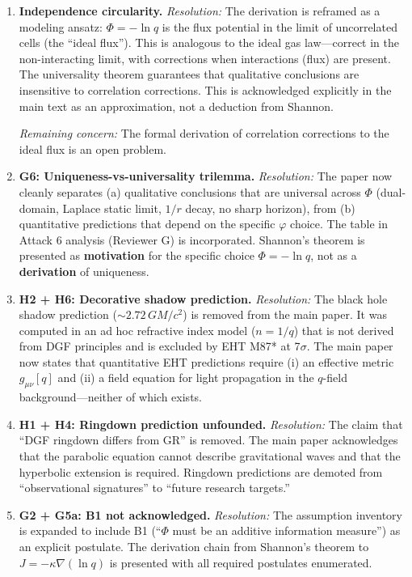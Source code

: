 \documentclass[reprint]{revtex4-2}
\begin{document}
\begin{enumerate}[leftmargin=*, label=\textbf{G1:}]
\item \textbf{Independence circularity.} \textit{Resolution:} The derivation is reframed as a modeling ansatz: $\Phi=-\ln q$ is the flux potential in the limit of uncorrelated cells (the ``ideal flux''). This is analogous to the ideal gas law---correct in the non-interacting limit, with corrections when interactions (flux) are present. The universality theorem guarantees that qualitative conclusions are insensitive to correlation corrections. This is acknowledged explicitly in the main text as an approximation, not a deduction from Shannon.

\textit{Remaining concern:} The formal derivation of correlation corrections to the ideal flux is an open problem.

\item \textbf{G6: Uniqueness-vs-universality trilemma.} \textit{Resolution:} The paper now cleanly separates (a) qualitative conclusions that are universal across $\Phi$ (dual-domain, Laplace static limit, $1/r$ decay, no sharp horizon), from (b) quantitative predictions that depend on the specific $\varphi$ choice. The table in Attack 6 analysis (Reviewer G) is incorporated. Shannon's theorem is presented as \textbf{motivation} for the specific choice $\Phi=-\ln q$, not as a \textbf{derivation} of uniqueness.

\item \textbf{H2 + H6: Decorative shadow prediction.} \textit{Resolution:} The black hole shadow prediction ($\sim 2.72\,GM/c^2$) is removed from the main paper. It was computed in an ad hoc refractive index model ($n=1/q$) that is not derived from DGF principles and is excluded by EHT M87* at 7$\sigma$. The main paper now states that quantitative EHT predictions require (i) an effective metric $g_{\mu\nu}[q]$ and (ii) a field equation for light propagation in the $q$-field background---neither of which exists.

\item \textbf{H1 + H4: Ringdown prediction unfounded.} \textit{Resolution:} The claim that ``DGF ringdown differs from GR'' is removed. The main paper acknowledges that the parabolic equation cannot describe gravitational waves and that the hyperbolic extension is required. Ringdown predictions are demoted from ``observational signatures'' to ``future research targets.''

\item \textbf{G2 + G5a: B1 not acknowledged.} \textit{Resolution:} The assumption inventory is expanded to include B1 (``$\Phi$ must be an additive information measure'') as an explicit postulate. The derivation chain from Shannon's theorem to $J=-\kappa\nabla(\ln q)$ is presented with all required postulates enumerated.


\end{enumerate}
\end{document}
